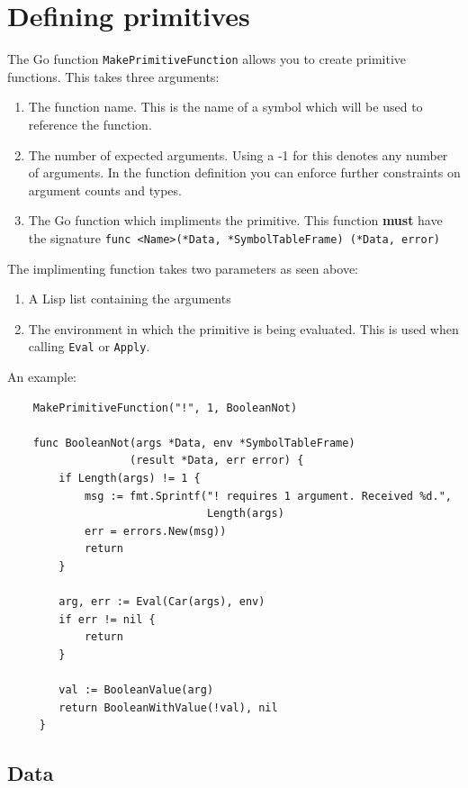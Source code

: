 \documentclass[12pt]{article}
\begin{document}
\section{Defining primitives}

The Go function \verb|MakePrimitiveFunction| allows you to create
primitive functions. This takes three arguments:

\begin{enumerate}
\item The function name. This is the name of a symbol which will be
  used to reference the function. 
\item The number of expected arguments. Using a -1 for this denotes
  any number of arguments. In the function definition you can enforce
  further constraints on argument counts and types. 
\item The Go function which impliments the primitive. This function
  {\bf must} have the signature
  \verb|func <Name>(*Data, *SymbolTableFrame) (*Data, error)| 
\end{enumerate}

\noindent The implimenting function takes two parameters as seen
above:

\begin{enumerate}
\item A Lisp list containing the arguments
\item The environment in which the primitive
  is being evaluated. This is used when calling \verb|Eval| or \verb|Apply|.
\end{enumerate}

\noindent An example:

\begin{verbatim}
    MakePrimitiveFunction("!", 1, BooleanNot)

    func BooleanNot(args *Data, env *SymbolTableFrame) 
                   (result *Data, err error) {
        if Length(args) != 1 {
            msg := fmt.Sprintf("! requires 1 argument. Received %d.", 
                               Length(args)
            err = errors.New(msg))
            return
        }

        arg, err := Eval(Car(args), env)
        if err != nil {
            return
        }

        val := BooleanValue(arg)
        return BooleanWithValue(!val), nil
     }
\end{verbatim}

\subsection{Data}
\end{document}

